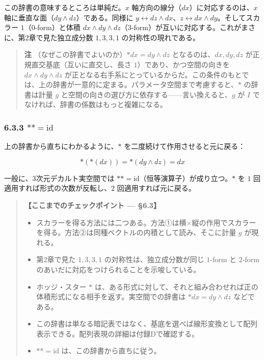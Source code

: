 \documentclass[a4paper,12pt,openany]{book}
\begin{document}
この辞書の意味するところは単純だ。\(x\)
軸方向の線分（\(dx\)）に対応するのは、\(x\)
軸に垂直な面（\(dy \wedge dz\)）である。同様に
\(y \leftrightarrow dz \wedge dx\)、\(z \leftrightarrow dx \wedge dy\)。そしてスカラー
\(1\)（\(0\)-form）と体積
\(dx \wedge dy \wedge dz\)（\(3\)-form）が互いに対応する。これがまさに、第2章で見た独立成分数
\(1, 3, 3, 1\) の対称性の現れである。

\begin{quote}
\textbf{注} （なぜこの辞書でよいのか）\(\ast dx = dy \wedge dz\)
となるのは、\(dx,dy,dz\) が正規直交基底（互いに直交し、長さ
\(1\)）であり、かつ空間の向きを \(dx \wedge dy \wedge dz\)
が正となる右手系にとっているからだ。この条件のもとでは、上の辞書が一意的に定まる。パラメータ空間まで考慮すると、\(\ast\)
の辞書は計量 \(g\)
と空間の向きの選び方に依存する——言い換えると、\(g\) が \(I\)
でなければ、辞書の係数はもっと複雑になる。
\end{quote}

\hypertarget{astast-mathrmid}{%
\subsubsection{\texorpdfstring{6.3.3
\(\ast\ast = \mathrm{id}\)}{6.3.3 \textbackslash ast\textbackslash ast = \textbackslash mathrm\{id\}}}\label{astast-mathrmid}}

上の辞書から直ちにわかるように、\(\ast\)
を二度続けて作用させると元に戻る：

\[\ast(\ast(dx)) = \ast(dy \wedge dz) = dx\]

一般に、3次元デカルト実空間では
\(\ast\ast = \mathrm{id}\)（恒等演算子）が成り立つ。\(\ast\) を \(1\)
回適用すれば形式の次数が反転し、\(2\) 回適用すれば元に戻る。

\begin{quote}
\textbf{【ここまでのチェックポイント — §6.3】}

\begin{itemize}
\item
  スカラーを得る方法には二つある。方法①は横×縦の作用でスカラーを得る。方法②は同種ベクトルの内積として読み、そこに計量
  \(g\) が現れる。
\item
  第2章で見た \(1,3,3,1\) の対称性は、独立成分数が同じ \(1\)-form と
  \(2\)-form のあいだに対応をつけられることを示唆している。
\item
  ホッジ・スター \(\ast\)
  は、ある形式に対して、それと組み合わせれば正の体積形式になる相手を返す。実空間での辞書は
  \(\ast dx = dy \wedge dz\) などである。
\item
  この辞書は単なる暗記表ではなく、基底を選べば線形変換として配列表示できる。配列表現の詳細は付録Dで確認する。
\item
  \(\ast\ast = \mathrm{id}\) は、この辞書から直ちに従う。
\end{itemize}
\end{quote}
\end{document}

